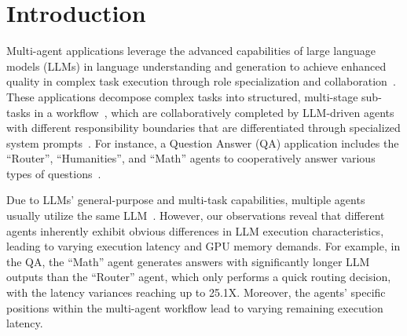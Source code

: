 \documentclass[sigplan,nonacm]{acmart}
\begin{document}


\maketitle



\section{Introduction}
Multi-agent applications leverage the advanced capabilities of large language models (LLMs) in language understanding and generation to achieve enhanced quality in complex task execution through role specialization and collaboration~\cite{hong2024metagpt,zhou2023agentsopensourceframeworkautonomous}. These applications decompose complex tasks into structured, multi-stage sub-tasks in a workflow~\cite{qian2024chatdev,wu2023autogenenablingnextgenllm,langflow,gpt_newspaper}, which are collaboratively completed by LLM-driven agents with different responsibility boundaries that are differentiated through specialized system prompts~\cite{hong2024metagpt,qian2024chatdev,gpt_researcher}. 
For instance, a Question Answer (QA) application includes the ``Router'', ``Humanities'', and ``Math'' agents to cooperatively answer various types of questions~\cite{gao2024agentscope}.



Due to LLMs' general-purpose and multi-task capabilities, multiple agents usually utilize the same LLM~\cite{10.5555/3691938.3691988,10.1145/3676641.3716278,hong2024metagpt,wu2023autogenenablingnextgenllm}.
However, our observations reveal that different agents inherently exhibit obvious differences in LLM execution characteristics, leading to varying execution latency and GPU memory demands. 
For example, in the QA, the ``Math'' agent generates answers with significantly longer LLM outputs than the ``Router'' agent, which only performs a quick routing decision, with the latency variances reaching up to 25.1X. Moreover, the agents' specific positions within the multi-agent workflow lead to varying remaining execution latency.
\end{document}
